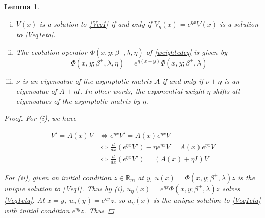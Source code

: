 \documentclass[12pt]{article}
\def\R{{\mathbb R}}
\newtheorem{lemma}{Lemma}
\begin{document}
\begin{lemma}\label{weightfacts}
\begin{enumerate}[(i)]

Let $A(x)$ be a matrix-valued function such that $A(x)$ is exponentially asymptotic to the constant matrix $A$. Consider the eigenvalue problem

\begin{equation}\label{Veq1}
V' = A(x)V
\end{equation}

and the corresponding weighted eigenvalue problem with exponential weight $\eta$

\begin{equation}\label{Veq1eta}
V_\eta' = (A(x) + \eta I)V_\eta
\end{equation}

\item $V(x)$ is a solution to \eqref{Veq1} if and only if $V_\eta(x) = e^{\eta x} V(x)$ is a solution to \eqref{Veq1eta}.

\item The evolution operator $\Phi(x, y; \beta^+, \lambda, \eta)$ of \eqref{weightedeq} is given by
\begin{equation}\label{evolweight}
\Phi(x, y; \beta^+, \lambda, \eta) = e^{\eta(x - y)} \Phi(x, y; \beta^+, \lambda)
\end{equation}

\item $\nu$ is an eigenvalue of the asymptotic matrix $A$ if and only if $\nu + \eta$ is an eigenvalue of $A + \eta I$. In other words, the exponential weight $\eta$ shifts all eigenvalues of the asymptotic matrix by $\eta$.

\end{enumerate}

\begin{proof}

For (i), we have

\begin{align*}
V' = A(x)V &\iff e^{\eta x} V' = A(x) e^{\eta x} V \\
&\iff \frac{d}{dx} (e^{\eta x} V') - \eta e^{\eta x} V = A(x) e^{\eta x} V \\
&\iff \frac{d}{dx} (e^{\eta x} V') = ( A(x) + \eta I)V 
\end{align*}

For (ii), given an initial condition $z \in \R_m$ at y, $u(x) = \Phi(x, y; \beta^+, \lambda) z$ is the unique solution to \eqref{Veq1}. Thus by (i), $u_\eta(x) = e^{\eta x} \Phi(x, y; \beta^+, \lambda) z$ solves \eqref{Veq1eta}. At $x = y$, $u_\eta(y) = e^{\eta y} z$, so $u_\eta(x)$ is the unique solution to \eqref{Veq1eta} with initial condition $e^{\eta y} z$. Thus


\end{proof}
\end{lemma}
\end{document}
